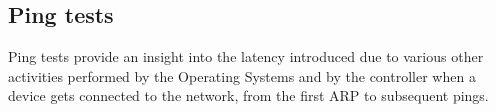 %	
\subsection{Ping tests}
Ping tests provide an insight into the latency introduced due to various other activities performed by the Operating Systems and by the controller when a device gets connected to the network, from the first ARP to subsequent pings.


